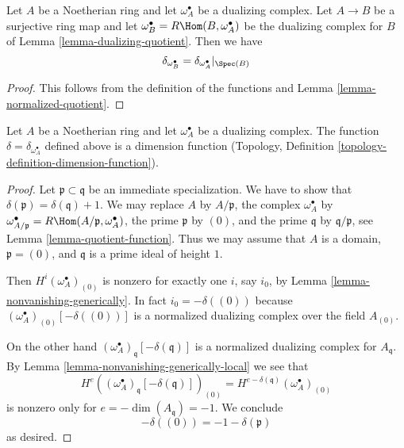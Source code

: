 \begin{lemma}
\label{lemma-quotient-function}
Let $A$ be a Noetherian ring and let $\omega_A^\bullet$ be a dualizing
complex. Let $A \to B$ be a surjective ring map and let
$\omega_B^\bullet = R\Hom(B, \omega_A^\bullet)$ be the dualizing
complex for $B$ of Lemma \ref{lemma-dualizing-quotient}. Then we have
$$
\delta_{\omega_B^\bullet} = \delta_{\omega_A^\bullet}|_{\Spec(B)}
$$
\end{lemma}

\begin{proof}
This follows from the definition of the functions and
Lemma \ref{lemma-normalized-quotient}.
\end{proof}

\begin{lemma}
\label{lemma-dimension-function}
Let $A$ be a Noetherian ring and let $\omega_A^\bullet$ be a dualizing
complex. The function $\delta = \delta_{\omega_A^\bullet}$
defined above is a dimension function
(Topology, Definition \ref{topology-definition-dimension-function}).
\end{lemma}

\begin{proof}
Let $\mathfrak p \subset \mathfrak q$ be an immediate specialization.
We have to show that $\delta(\mathfrak p) = \delta(\mathfrak q) + 1$.
We may replace $A$ by $A/\mathfrak p$, the complex $\omega_A^\bullet$ by
$\omega_{A/\mathfrak p}^\bullet = R\Hom(A/\mathfrak p, \omega_A^\bullet)$,
the prime $\mathfrak p$ by $(0)$, and the prime $\mathfrak q$
by $\mathfrak q/\mathfrak p$,
see Lemma \ref{lemma-quotient-function}. Thus we may assume that
$A$ is a domain, $\mathfrak p = (0)$, and $\mathfrak q$ is a prime
ideal of height $1$.

\medskip\noindent
Then $H^i(\omega_A^\bullet)_{(0)}$ is nonzero
for exactly one $i$, say $i_0$, by Lemma \ref{lemma-nonvanishing-generically}.
In fact $i_0 = -\delta((0))$ because
$(\omega_A^\bullet)_{(0)}[-\delta((0))]$
is a normalized dualizing complex over the field $A_{(0)}$.

\medskip\noindent
On the other hand $(\omega_A^\bullet)_\mathfrak q[-\delta(\mathfrak q)]$
is a normalized dualizing complex for $A_\mathfrak q$. By
Lemma \ref{lemma-nonvanishing-generically-local}
we see that
$$
H^e((\omega_A^\bullet)_\mathfrak q[-\delta(\mathfrak q)])_{(0)} =
H^{e - \delta(\mathfrak q)}(\omega_A^\bullet)_{(0)}
$$
is nonzero only for $e = -\dim(A_\mathfrak q) = -1$.
We conclude
$$
-\delta((0)) = -1 - \delta(\mathfrak p)
$$
as desired.
\end{proof}

